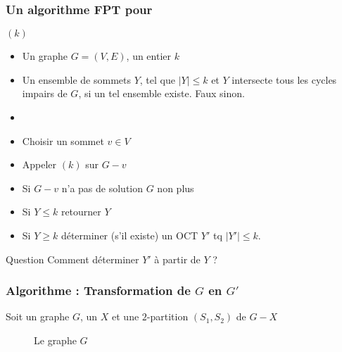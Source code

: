 \documentclass[9pt]{beamer}
\begin{document}
\begin{frame}
    \frametitle{Un algorithme FPT pour \oct}

    \oct$(k)$
    \begin{itemize} 
        \item[] Un graphe $G=(V,E)$, un entier $k$
        \item[] Un ensemble de sommets $Y$, tel que $|Y| \leq k$ et $Y$ intersecte tous les
            cycles impairs de $G$, si un tel ensemble existe. Faux sinon.
        \item[]
        \item Choisir un sommet $v \in V$
        \item Appeler \oct$(k)$ sur $G - v$
        \item Si $G-v$ n'a pas de solution $G$ non plus
        \item Si $Y \leq k$ retourner $Y$
        \item Si $Y \geq k$ déterminer (s'il existe) un OCT $Y'$ tq $|Y'| \leq k$.
    \end{itemize}

    \pause
    \vfill

    \begin{alertblock}{Question}
        Comment déterminer $Y'$ à partir de $Y$ ?
    \end{alertblock}
\end{frame}
\begin{frame}
    \frametitle{Algorithme : Transformation de $G$ en $G'$}
    Soit un graphe $G$, un \oct $X$ et une $2$-partition $(S_1, S_2)$ de $G - X$
    \vfill

    \begin{figure}
        \begin{center}
        \end{center}
        \caption{Le graphe $G$}
    \end{figure}
\end{frame}
\end{document}

